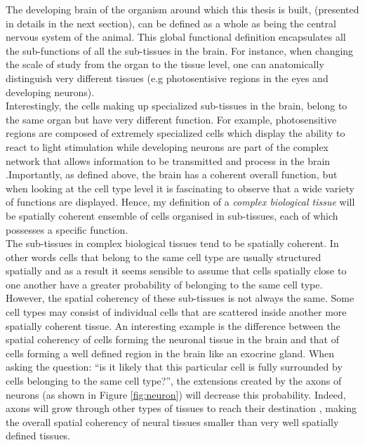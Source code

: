     The developing brain of the organism around which this thesis is built, \platyfull{} (presented in details in the next section), can be defined as a whole as being the central nervous system of the animal. This global functional definition encapsulates all the sub-functions of all the sub-tissues in the brain. For instance, when changing the scale of study from the organ to the tissue level, one can anatomically distinguish very different tissues (e.g photosentisive regions in the eyes and developing neurons).\\
    
    Interestingly, the cells making up specialized sub-tissues in the brain, belong to the same organ but have very different function. For example, photosensitive regions are composed of extremely specialized cells which display the ability to react to light stimulation \cite{arendt02} while developing neurons are part of the complex network that allows information to be transmitted and process in the brain \cite{Fischer10}.Importantly, as defined above, the brain has a coherent overall function, but when looking at the cell type level it is fascinating to observe that a wide variety of functions are displayed. Hence, my definition of a \emph{complex biological tissue} will be spatially coherent ensemble of cells organised in sub-tissues, each of which possesses a specific function.\\
    
     
    The sub-tissues in complex biological tissues tend to be spatially coherent. In other words cells that belong to the same cell type are usually structured spatially and as a result it seems sensible to assume that cells spatially close to one another have a greater probability of belonging to the same cell type. However, the spatial coherency of these sub-tissues is not always the same. Some cell types may consist of individual cells that are scattered inside another more spatially coherent tissue. An interesting example is the difference between the spatial coherency of cells forming the neuronal tissue in the brain and that of cells forming a well defined region in the brain like an exocrine gland. When asking the question: ``is it likely that this particular cell is fully surrounded by cells belonging to the same cell type?'', the extensions created by the axons of neurons (as shown in Figure \ref{fig:neuron}) will decrease this probability. Indeed, axons will grow through other types of tissues to reach their destination \citep{bartlett84,colello90}, making the overall spatial coherency of neural tissues smaller than very well spatially defined tissues.\\
    
